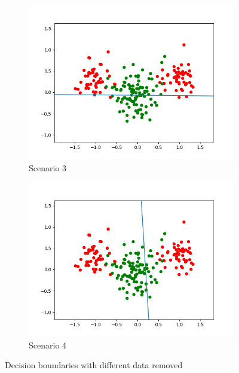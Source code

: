\documentclass[a4paper]{article}
\begin{document}
\begin{figure}[htb]
\begin{subfigure}{0.4\textwidth}
        \includegraphics[width=\textwidth]{Labs/Lab 1/Lab 1a/Results/scenario3.png}
        \caption{Scenario 3}
        \label{fig:scenario-3}
    \end{subfigure}
    \hfill
    \begin{subfigure}{0.4\textwidth}
        \includegraphics[width=\textwidth]{Labs/Lab 1/Lab 1a/Results/scenario4.png}
        \caption{Scenario 4}
        \label{fig:scenario-4}
    \end{subfigure}
    \caption{Decision boundaries with different data removed}
    \label{fig:9}
\end{figure}
\end{document}
